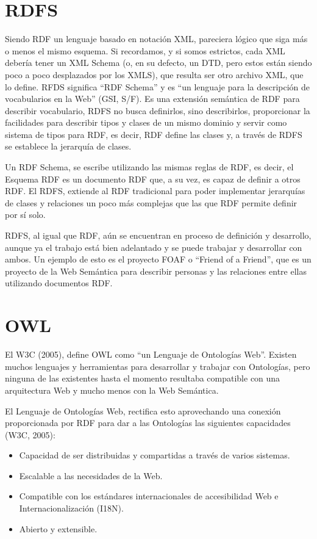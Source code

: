 \section{RDFS}

Siendo RDF un lenguaje basado en notación XML, pareciera lógico que siga más o menos el mismo esquema. Si recordamos, y si somos estrictos, cada XML debería tener un XML Schema (o, en su defecto, un DTD, pero estos están siendo poco a poco desplazados por los XMLS), que resulta ser otro archivo XML, que lo define. RFDS significa ``RDF Schema'' y es ``un lenguaje para la descripción de vocabularios en la Web'' (GSI, S/F). Es una extensión semántica de RDF para describir vocabulario, RDFS no busca definirlos, sino describirlos, proporcionar la facilidades para describir tipos y clases de un mismo dominio y servir como sistema de tipos para RDF, es decir, RDF define las clases y, a través de RDFS se establece la jerarquía de clases.

Un RDF Schema, se escribe utilizando las mismas reglas de RDF, es decir, el Esquema RDF es un documento RDF que, a su vez, es capaz de definir a otros RDF. El RDFS, extiende al RDF tradicional para poder implementar jerarquías de clases y relaciones un poco más complejas que las que RDF permite definir por sí solo.

RDFS, al igual que RDF, aún se encuentran en proceso de definición y desarrollo, aunque ya el trabajo está bien adelantado y se puede trabajar y desarrollar con ambos. Un ejemplo de esto es el proyecto FOAF o ``Friend of a Friend'', que es un proyecto de la Web Semántica para describir personas y las relaciones entre ellas utilizando documentos RDF.

\section{OWL}

El W3C (2005), define OWL como ``un Lenguaje de Ontologías Web''. Existen muchos lenguajes y herramientas para desarrollar y trabajar con Ontologías, pero ninguna de las existentes hasta el momento resultaba compatible con una arquitectura Web y mucho menos con la Web Semántica. 

El Lenguaje de Ontologías Web, rectifica esto aprovechando una conexión proporcionada por RDF para dar a las Ontologías las siguientes capacidades (W3C, 2005):

\begin{itemize}
\item Capacidad de ser distribuidas y compartidas a través de varios sistemas.
\item Escalable a las necesidades de la Web.
\item Compatible con los estándares internacionales de accesibilidad Web e Internacionalización (I18N).
\item Abierto y extensible.
\end{itemize}

